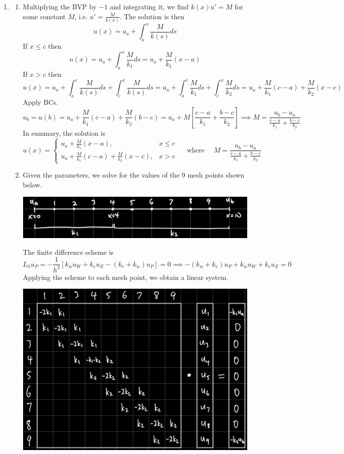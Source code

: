 \documentclass{article}
\newcommand{\sbr}[1]{\left[#1\right]}
\newcommand{\imp}{\implies}
\begin{document}
\begin{enumerate}
	
\item 

\begin{enumerate}
	
	
	\item Multiplying the BVP by $-1$ and integrating it, we find $k(x)u'=M$ for some constant $M$, i.e. $u'=\frac{M}{k(x)}$. The solution is then
	$$u(x) = u_a + \int_a^x \frac{M}{k(s)}ds$$
	If $x\le c$ then
	$$u(x) = u_a + \int_a^x \frac{M}{k_1}ds = u_a + \frac{M}{k_1}(x-a)$$
	If $x>c$ then
	$$u(x) = u_a + \int_a^c \frac{M}{k(s)}ds + \int_c^x \frac{M}{k(s)}ds
	= u_a + \int_a^c \frac{M}{k_1}ds + \int_c^x \frac{M}{k_2}ds
	= u_a + \frac{M}{k_1}(c - a) + \frac{M}{k_2}(x - c)$$
	Apply BCs.
	$$u_b = u(b)
	= u_a + \frac{M}{k_1}(c - a) + \frac{M}{k_2}(b - c)
	= u_a + M\sbr{\frac{c-a}{k_1} + \frac{b-c}{k_2}}
	\imp M = \frac{u_b-u_a}{\frac{c-a}{k_1}+\frac{b-c}{k_2}}$$
	In summary, the solution is
	$$u(x) = 
	\begin{cases}
		u_a + \frac{M}{k_1}(x-a), & x\le c\\
		u_a + \frac{M}{k_1}(c - a) + \frac{M}{k_2}(x - c), & x>c
	\end{cases}
	\quad \text{ where }
	\quad M = \frac{u_b-u_a}{\frac{c-a}{k_1}+\frac{b-c}{k_2}}$$
	
	
	\item Given the parameters, we solve for the values of the 9 mesh points shown below.
	\begin{center}
		\includegraphics[scale=.09]{hw7 q2 mesh}
	\end{center}
	
	The finite difference scheme is
	$$L_hu_P = -\frac{1}{h^2}\sbr{k_wu_W + k_eu_E - (k_e + k_w)u_P} = 0
	\imp -(k_w + k_e)u_P + k_wu_W + k_eu_E = 0$$
	Applying the scheme to each mesh point, we obtain a linear system.
	\begin{center}
		\includegraphics[scale=.09]{hw7 q2 full}
	\end{center}
	

\end{enumerate}
\end{enumerate}
\end{document}
